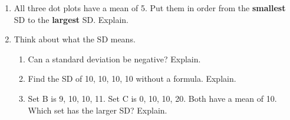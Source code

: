 \documentclass[11pt]{article}
\begin{document}
\begin{enumerate}
\begin{enumerate}[itemsep=1.2em]
  \work{1.5em}
  \item Find $s$ for Player A.

  \work{5em}
  \item Player B's SD is about 6.67. A coach needs a player who scores close to 10 points every game. Which player should the coach choose? Explain.

\end{enumerate}

\newpage
\item All three dot plots have a mean of 5. Put them in order from the \textbf{smallest} SD to the \textbf{largest} SD. Explain.
\begin{center}\end{center}
\work{4em}

\item Think about what the SD means.
\begin{enumerate}[itemsep=\ifkey 2.4em\else 5em\fi]
  \item Can a standard deviation be negative? Explain.

  \item Find the SD of 10, 10, 10, 10 without a formula. Explain.

  \item Set B is 9, 10, 10, 11. Set C is 0, 10, 10, 20. Both have a mean of 10. Which set has the larger SD? Explain.

\end{enumerate}

\end{enumerate}
\end{document}

